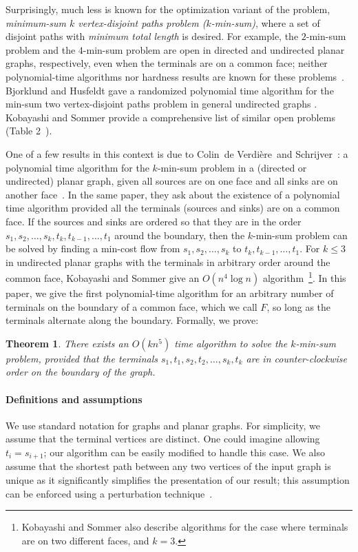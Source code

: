 \documentclass[11pt,twoside]{article}
\newcommand{\EMPH}[1]{\emph{#1}}
\newtheorem{theorem}{Theorem}[section]
\newcommand{\eric}{Colin~de Verdi{\`e}re}
\begin{document}
Surprisingly, much less is known for the optimization variant of the problem, \EMPH{minimum-sum $k$ vertex-disjoint paths problem ($k$-min-sum)}, where a set of disjoint paths with \emph{minimum total length} is desired. 
For example, the $2$-min-sum problem and the $4$-min-sum problem are open in directed and undirected planar graphs, respectively, even when the terminals are on a common face; neither polynomial-time algorithms nor hardness results are known for these problems~\cite{kobayashi2010shortest}. Bjorklund and Husfeldt gave a randomized polynomial time algorithm for the min-sum two vertex-disjoint paths problem in general undirected graphs \cite{bjorklund2014shortest}. Kobayashi and Sommer provide a comprehensive list of similar open problems (Table 2~\cite{kobayashi2010shortest}).



One of a few results in this context is due to \eric~and Schrijver~\cite{verdiere2011shortest}: a polynomial time algorithm for the $k$-min-sum problem in a (directed or undirected) planar graph, given all sources are on one face and all sinks are on another face~\cite{verdiere2011shortest}.  In the same paper, they ask about the existence of a polynomial time algorithm provided all the terminals (sources and sinks) are on a common face. If the sources and sinks are ordered so that they are in the order $s_1, s_2, \ldots, s_k, t_k, t_{k-1}, \ldots, t_1$ around the boundary, then the $k$-min-sum problem can be solved by finding a min-cost flow from $s_1, s_2, \ldots, s_k$ to $t_k, t_{k-1}, \ldots, t_1$.  For $k \le 3$ in undirected planar graphs with the terminals in arbitrary order around the common face, Kobayashi and Sommer give an $O(n^4\log n)$ algorithm~\cite{kobayashi2010shortest}\footnote{Kobayashi and Sommer also describe algorithms for the case where terminals are on two different faces, and $k = 3$.}.
In this paper, we give the first polynomial-time algorithm for an arbitrary number of terminals on the boundary of a common face, which we call $F$, so long as the terminals alternate along the boundary.  Formally, we prove:
\begin{theorem}
There exists an $O(kn^5)$ time algorithm to solve the $k$-min-sum problem, provided that the terminals $s_1, t_1, s_2, t_2, \ldots, s_k, t_k$ are in counter-clockwise order on the boundary of the graph.
\end{theorem}

\paragraph{Definitions and assumptions} We use standard notation for graphs and planar graphs.  For simplicity, we assume that the terminal vertices are distinct.  One could imagine allowing $t_i = s_{i+1}$; our algorithm can be easily modified to handle this case.  We also assume that the shortest path between any two vertices of the input graph is unique as it significantly simplifies the presentation of our result; this assumption can be enforced using a perturbation technique~\cite{MVV87}.
\end{document}

